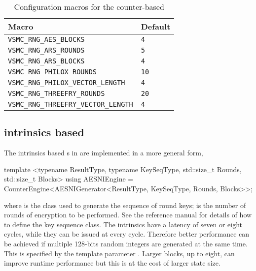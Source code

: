 \begin{table}[t]
  \begin{tabu}{X[l]X[l]}
    \toprule
    Macro & Default \\
    \midrule
    \texttt{VSMC\_RNG\_AES\_BLOCKS} & \texttt{4} \\
    \texttt{VSMC\_RNG\_ARS\_ROUNDS} & \texttt{5} \\
    \texttt{VSMC\_RNG\_ARS\_BLOCKS} & \texttt{4} \\
    \texttt{VSMC\_RNG\_PHILOX\_ROUNDS} & \texttt{10} \\
    \texttt{VSMC\_RNG\_PHILOX\_VECTOR\_LENGTH} & \texttt{4} \\
    \texttt{VSMC\_RNG\_THREEFRY\_ROUNDS} & \texttt{20} \\
    \texttt{VSMC\_RNG\_THREEFRY\_VECTOR\_LENGTH} & \texttt{4} \\
    \bottomrule
  \end{tabu}
  \caption{Configuration macros for the counter-based \rng}
  \label{tab:Configuration macros for the counter-based RNG}
\end{table}

\subsection{\protect\aesni intrinsics based \protect\rng}
\label{sub:AES-NI intrinsics based RNG}

The \aesni intrinsics based \rng{}s in \textcite{Salmon:2011um} are implemented
in a more general form,
\begin{cppcode}
  template <typename ResultType, typename KeySeqType, std::size_t Rounds,
  std::size_t Blocks>
  using AESNIEngine =
  CounterEngine<AESNIGenerator<ResultType, KeySeqType, Rounds, Blocks>>;
\end{cppcode}
where  is the class used to generate the sequence of
round keys;  is the number of rounds of \aes encryption to be
performed. See the reference manual for details of how to define the key
sequence class. The \aesni intrinsics have a latency of seven or eight cycles,
while they can be issued at every cycle. Therefore better performance can be
achieved if multiple 128-bits random integers are generated at the same time.
This is specified by the template parameter . Larger blocks,
up to eight, can improve runtime performance but this is at the cost of larger
state size.

